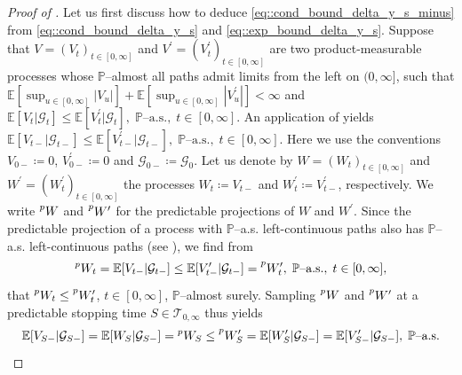\documentclass[10pt]{article} %
\newcommand\cG{\mathcal G}
\newcommand\cT{\mathcal T}
\def \E{\mathbb{E}}
\def \P{\mathbb{P}}
\begin{document}
\begin{proof}[Proof of ]
	Let us first discuss how to deduce \eqref{eq::cond_bound_delta_y_s_minus} from \eqref{eq::cond_bound_delta_y_s} and \eqref{eq::exp_bound_delta_y_s}. Suppose that $V = (V_t)_{t \in [0,\infty]}$ and $V^\prime = (V^\prime_t)_{t \in [0,\infty]}$ are two product-measurable processes whose $\P$--almost all paths admit limits from the left on $(0,\infty]$, such that $\E[\sup_{u \in [0,\infty]}|V_u|] + \E[\sup_{u \in [0,\infty]}|V^\prime_u|] < \infty$ and $\E[V_t |\cG_t] \leq \E[V^\prime_t |\cG_t], \; \text{$\P$--a.s.}, \; t \in [0,\infty]$. An application of  yields $\E[V_{t-}|\cG_{t-}] \leq \E[V^\prime_{t-}|\cG_{t-}], \; \text{$\P$--a.s.}, \; t \in [0,\infty]$. Here we use the conventions $V_{0-} \coloneqq 0$, $V^\prime_{0-} \coloneqq 0$ and $\cG_{0-} \coloneqq \cG_0$. Let us denote by $W = (W_t)_{t \in [0,\infty]}$ and $W^\prime = (W^\prime_t)_{t \in [0,\infty]}$ the processes $W_t \coloneqq V_{t-}$ and $W^\prime_t \coloneqq V^\prime_{t-}$, respectively. We write $\prescript{p}{}{W}$ and $\prescript{p}{}{W^\prime}$ for the predictable projections of $W$ and $W^\prime$. Since the predictable projection of a process with $\P$--a.s. left-continuous paths also has $\P$--a.s. left-continuous paths (see \cite[Theorem VI.47 and Remark VI.50.(f)]{dellacherie1982probabilities}), we find from
	\begin{equation*}
		\prescript{p}{}{W_t} = \E[V_{t-}|\cG_{t-}] \leq \E[V^\prime_{t-}|\cG_{t-}] = \prescript{p}{}{W^\prime_t}, \; \text{$\P$--a.s.}, \; t \in [0,\infty],
	\end{equation*}
	that $\prescript{p}{}{W_t} \leq \prescript{p}{}{W^\prime_t}$, $t \in [0,\infty]$, $\P$--almost surely. Sampling $\prescript{p}{}{W}$ and $\prescript{p}{}{W^\prime}$ at a predictable stopping time $S \in \cT_{0,\infty}$ thus yields
	\begin{equation*}
		\E[V_{S-}|\cG_{S-}] = \E[W_S|\cG_{S-}] = \prescript{p}{}{W_S} \leq \prescript{p}{}{W^\prime_S} = \E[W^\prime_S|\cG_{S-}] = \E[V^\prime_{S-}|\cG_{S-}], \; \text{$\P$--a.s.}
	\end{equation*}


\end{proof}
\end{document}
